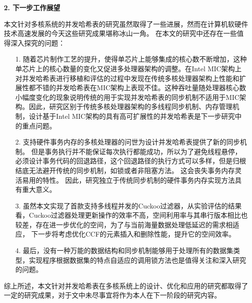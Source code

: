 \begin{summary}
\textbf{2. 下一步工作展望}

本文针对多核系统的并发哈希表的研究虽然取得了一些进展，然而在计算机软硬件技术高速发展的今天这些研究成果堪称冰山一角。
在本文的研究中还存在一些值得深入探究的问题：
\begin{itemize}
\item[1.] 随着芯片制作工艺的提升，使得单芯片上能够集成的核心数不断增加，这种单芯片上的核心数量的变化又促进多处理器架构的调整。在Intel MIC架构上对并发哈希表进行移植和评估的过程中发现在传统多核处理器架构上性能和扩展性都不错的并发哈希表在MIC架构上表现不佳。这种吞吐量随处理器核心数小幅度变化的现象说明传统的用于实现并发哈希表的同步机制不适用于MIC架构。因此，研究区别于传统多核处理器架构的多线程同步机制、内存管理机制，设计基于Intel MIC架构的具有高可扩展性的并发哈希表是下一步研究中的重点问题。
\item[2.] 支持硬件事务内存的多核处理器的问世为设计并发哈希表提供了新的同步机制。
但是事务执行并不能保证每次执行都能成功，所以为了避免线程悬停，必须设计事务代码的回退路径，这个回退路径的执行方式可以多样，但是归根结底无法避开传统的同步机制，如锁或者非阻塞方法。
这会丧失事务内存灵活易用的特性。
因此，研究独立于传统同步机制的硬件事务内存实现方法具有重大意义。
\item[3.] 虽然本文实现了首款支持多线程并发的Cuckoo过滤器，从实验评估的结果看，Cuckoo过滤器处理更新操作的效率不高，空间利用率与其串行版本相比也较差，存在进一步优化的空间，为了与当前海量数据处理低延迟的需求相适应，
下一步将考虑优化CCF的元素插入和删除性能，提升它的空间效率。
\item[4.] 最后，没有一种万能的数据结构和同步机制能够用于处理所有的数据集类型，实现程序根据数据集的特点自适应的调用锁方法也是值得关注和深入研究的问题。
\end{itemize}

综上所述，本文针对并发哈希表在多核系统上的设计、优化和应用的研究都取得了一定的研究成果，对于文中未尽事宜将作为本人在下一阶段的研究内容。
\end{summary}